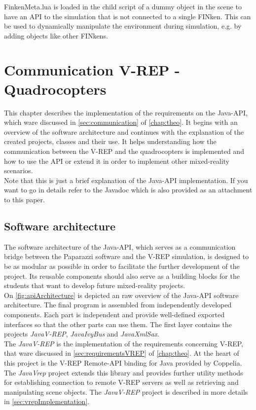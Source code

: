 FinkenMeta.lua is loaded in the child script of a dummy object in the scene  to have an API to the simulation that is not connected to a single FINken. This can be used to dynamically manipulate the environment during simulation, e.g. by adding objects like other FINkens.

\section{Communication V-REP - Quadrocopters}
\label{sec:commImplementation}

This chapter describes the implementation of the requirements on the Java-API, which ware discussed in \ref{sec:communication} of \ref{chap:theo}. It begins with an overview of the software architecture and continues with the explanation of the created projects, classes and their use. It helps understanding how the communication between the V-REP and the quadrocopters is implemented and how to use the API or extend it in order to implement other mixed-reality scenarios.\\
Note that this is just a brief explanation of the Java-API implementation. If you want to go in details refer to the Javadoc which is also provided as an attachment to this paper.

\subsection{Software architecture}

The software architecture of the Java-API, which serves as a communication bridge between the Paparazzi software and the V-REP simulation, is designed to be as modular as possible in order to facilitate the further development of the project. Its reusable components should also serve as a building blocks for the students that want to develop future mixed-reality projects. \\

On \ref{fig:apiArchitecture} is depicted an raw overview of the Java-API software architecture.
The final program is assembled from independently developed components. Each part is independent and provide well-defined exported interfaces so that the other parts can use them.
The first layer contains the projects \textit{JavaV-REP}, \textit{JavaIvyBus} and \textit{JavaXmlSax}.\\
The \textit{JavaV-REP} is the implementation of the requirements concerning V-REP, that ware discussed in \ref{sec:requirementsVREP} of \ref{chap:theo}. At the heart of this project is the V-REP Remote-API binding for Java provided by Coppelia. The \textit{JavaVrep} project extends this library and provides further utility methods for establishing connection to remote V-REP servers as well as retrieving and manipulating scene objects. The \textit{JavaV-REP} project is described in more details in \ref{sec:vrepImplementation}.\\

